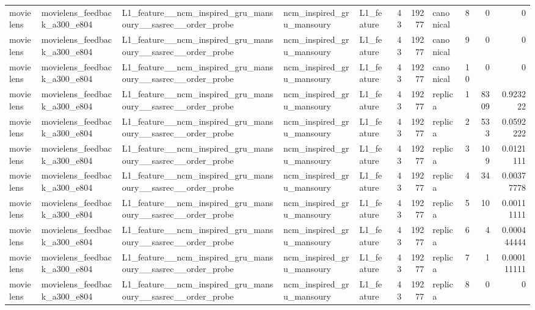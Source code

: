 \begin{table}[htbp!]
\begin{tabular}{lllllrrlrrr}
movielens & movielens\_feedback\_a300\_e804 & L1\_feature\_\_ncm\_inspired\_gru\_mansoury\_\_sasrec\_\_order\_probe & ncm\_inspired\_gru\_mansoury & L1\_feature & 43 & 19277 & canonical & 8 & 0 & 0 \\
movielens & movielens\_feedback\_a300\_e804 & L1\_feature\_\_ncm\_inspired\_gru\_mansoury\_\_sasrec\_\_order\_probe & ncm\_inspired\_gru\_mansoury & L1\_feature & 43 & 19277 & canonical & 9 & 0 & 0 \\
movielens & movielens\_feedback\_a300\_e804 & L1\_feature\_\_ncm\_inspired\_gru\_mansoury\_\_sasrec\_\_order\_probe & ncm\_inspired\_gru\_mansoury & L1\_feature & 43 & 19277 & canonical & 10 & 0 & 0 \\
movielens & movielens\_feedback\_a300\_e804 & L1\_feature\_\_ncm\_inspired\_gru\_mansoury\_\_sasrec\_\_order\_probe & ncm\_inspired\_gru\_mansoury & L1\_feature & 43 & 19277 & replica & 1 & 8309 & 0.923222 \\
movielens & movielens\_feedback\_a300\_e804 & L1\_feature\_\_ncm\_inspired\_gru\_mansoury\_\_sasrec\_\_order\_probe & ncm\_inspired\_gru\_mansoury & L1\_feature & 43 & 19277 & replica & 2 & 533 & 0.0592222 \\
movielens & movielens\_feedback\_a300\_e804 & L1\_feature\_\_ncm\_inspired\_gru\_mansoury\_\_sasrec\_\_order\_probe & ncm\_inspired\_gru\_mansoury & L1\_feature & 43 & 19277 & replica & 3 & 109 & 0.0121111 \\
movielens & movielens\_feedback\_a300\_e804 & L1\_feature\_\_ncm\_inspired\_gru\_mansoury\_\_sasrec\_\_order\_probe & ncm\_inspired\_gru\_mansoury & L1\_feature & 43 & 19277 & replica & 4 & 34 & 0.00377778 \\
movielens & movielens\_feedback\_a300\_e804 & L1\_feature\_\_ncm\_inspired\_gru\_mansoury\_\_sasrec\_\_order\_probe & ncm\_inspired\_gru\_mansoury & L1\_feature & 43 & 19277 & replica & 5 & 10 & 0.00111111 \\
movielens & movielens\_feedback\_a300\_e804 & L1\_feature\_\_ncm\_inspired\_gru\_mansoury\_\_sasrec\_\_order\_probe & ncm\_inspired\_gru\_mansoury & L1\_feature & 43 & 19277 & replica & 6 & 4 & 0.000444444 \\
movielens & movielens\_feedback\_a300\_e804 & L1\_feature\_\_ncm\_inspired\_gru\_mansoury\_\_sasrec\_\_order\_probe & ncm\_inspired\_gru\_mansoury & L1\_feature & 43 & 19277 & replica & 7 & 1 & 0.000111111 \\
movielens & movielens\_feedback\_a300\_e804 & L1\_feature\_\_ncm\_inspired\_gru\_mansoury\_\_sasrec\_\_order\_probe & ncm\_inspired\_gru\_mansoury & L1\_feature & 43 & 19277 & replica & 8 & 0 & 0 \\

\end{tabular}
\end{table}
